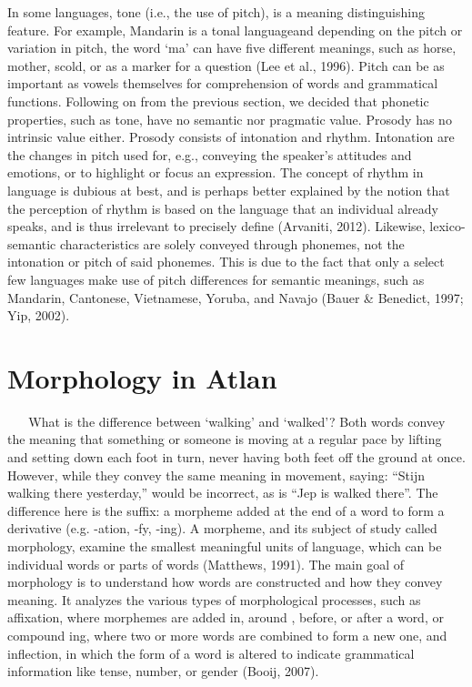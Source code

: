 \noindent In some languages, tone (i.e., the use of pitch), is a meaning distinguishing feature. For example, Mandarin is a tonal languageand depending on the pitch or variation in pitch, the word ‘ma’ can have five different meanings, such as horse, mother, scold, or as a marker for a question (Lee et al., 1996). Pitch can be as important as vowels themselves for comprehension of words and grammatical functions. Following on from the previous section, we decided that phonetic properties, such as tone, have no semantic nor pragmatic value. Prosody has no intrinsic value either. Prosody consists of intonation and rhythm. Intonation are the changes in pitch used for, e.g., conveying the speaker's attitudes and emotions, or to highlight or focus an expression. The concept of rhythm in language is dubious at best, and is perhaps better explained by the notion that the perception of rhythm is based on the language that an individual already speaks, and is thus irrelevant to precisely define (Arvaniti, 2012). Likewise, lexico-semantic characteristics are solely conveyed through phonemes, not the intonation or pitch of said phonemes. This is due to the fact that only a select few languages make use of pitch differences for semantic meanings, such as Mandarin, Cantonese, Vietnamese, Yoruba, and Navajo (Bauer \& Benedict, 1997; Yip, 2002). 
  
\section{Morphology in Atlan} 
  
\noindent What is the difference between ‘walking’ and ‘walked’? Both words convey the meaning that something or someone is moving at a regular pace by lifting and setting down each foot in turn, never having both feet off the ground  at once. However, while they convey the same meaning in movement, saying: “Stijn walking there yesterday,” would be incorrect, as is “Jep is walked there”. The difference here is the suffix: a morpheme added at the end of a word to form a derivative (e.g. -ation, -fy, -ing). A morpheme, and its subject of study called morphology, examine the smallest meaningful units of language, which can be individual words or parts of words (Matthews, 1991). The main goal of morphology is to understand how words are constructed and how they convey meaning. It analyzes the various types of morphological processes, such as affixation, where morphemes are added in, around , before, or after a word, or compound ing, where two or more words are combined to form a new one, and inflection, in which the form of a word is altered to indicate grammatical information like tense, number, or gender (Booij, 2007). 


